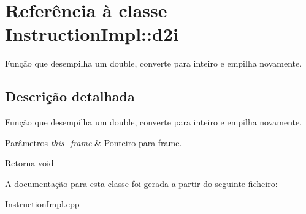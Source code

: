 \hypertarget{class_instruction_impl_1_1d2i}{}\section{Referência à classe Instruction\+Impl\+:\+:d2i}
\label{class_instruction_impl_1_1d2i}


Função que desempilha um double, converte para inteiro e empilha novamente.  




\subsection{Descrição detalhada}
Função que desempilha um double, converte para inteiro e empilha novamente. 


\begin{DoxyParams}{Parâmetros}
{\em this\+\_\+frame} & Ponteiro para frame. \\
\hline
\end{DoxyParams}
\begin{DoxyReturn}{Retorna}
void 
\end{DoxyReturn}


A documentação para esta classe foi gerada a partir do seguinte ficheiro\+:\begin{DoxyCompactItemize}
\item 
\hyperlink{_instruction_impl_8cpp}{Instruction\+Impl.\+cpp}\end{DoxyCompactItemize}
